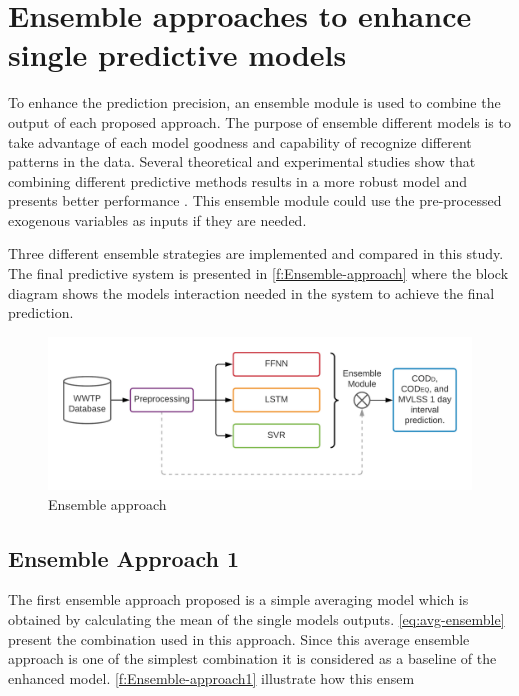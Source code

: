 \section{Ensemble approaches to enhance single predictive models}
\label{s:Ensembles}

To enhance the prediction precision, an ensemble module is used to combine the output of each proposed approach. The purpose of ensemble different models is to take advantage of each model goodness and capability of recognize different patterns in the data. Several theoretical and experimental studies show that combining different predictive methods results in a more robust model and presents better performance \cite{Nourani2021}. This ensemble module could use the pre-processed exogenous variables as inputs if they are needed.

Three different ensemble strategies are implemented and compared in this study. The final predictive system is presented in \autoref{f:Ensemble-approach} where the block diagram shows the models interaction needed in the system to achieve the final prediction. 

\begin{figure}[h]
\centering
\includegraphics[width=\linewidth]{figures/Ch5/Thesis-Approaches-Ensemble.png}
\caption{Ensemble approach}
\label{f:Ensemble-approach}
\end{figure}

\subsection{Ensemble Approach 1}
\label{s:Ensemble-Approach1}
The first ensemble approach proposed is a simple averaging model which is obtained by calculating the mean of the single models outputs. \autoref{eq:avg-ensemble} present the combination used in this approach. Since this average ensemble approach is one of the simplest combination it is considered as a baseline of the enhanced model. \autoref{f:Ensemble-approach1} illustrate how this ensem

